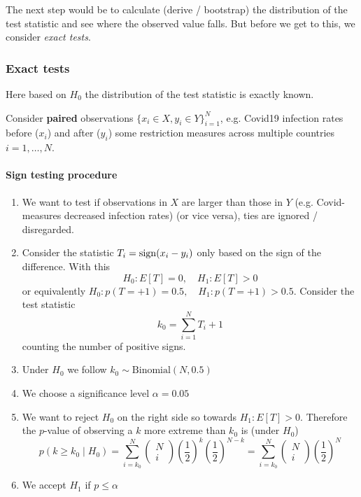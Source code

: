 The next step would be to calculate (derive / bootstrap) the distribution of the test statistic and see
where the observed value falls. But before we get to this, we consider 
\textit{exact tests}.

\subsubsection{Exact tests}
Here based on $H_0$ the distribution of the test statistic is exactly known.

Consider \textbf{paired} observations $\{ x_i \in X, y_i \in Y \}_{i=1}^N$, e.g. Covid19 infection rates before
($x_i$) and after ($y_i$) some restriction measures across multiple countries $i=1,\ldots,N$.
\paragraph*{Sign testing procedure}
\begin{enumerate}
    \item We want to test if observations in $X$ are larger than those in $Y$ (e.g. Covid-measures
    decreased infection rates) (or vice versa), ties are ignored / disregarded.
    \item Consider the statistic $T_i = \operatorname{sign}(x_i-y_i)$ only based on the sign of the difference.
    With this
    \begin{equation}
        H_0: E[T] = 0, \quad H_1: E[T] > 0
    \end{equation}
    or equivalently $H_0: p(T = +1) = 0.5, \quad H_1: p(T = +1) > 0.5$. Consider the test statistic
    \begin{equation}
        k_0 = \sum_{i=1}^N T_i + 1
    \end{equation}
    counting the number of positive signs.
    \item Under $H_0$ we follow $k_0 \sim \text{Binomial}(N,0.5)$
    \item We choose a significance level $\alpha = 0.05$
    \item We want to reject $H_0$ on the right side so towards $H_1: E[T] > 0$. Therefore
    the $p$-value of observing a $k$ more extreme than $k_0$ is (under $H_0$)
    \begin{equation}
        p\left(k \geq k_0 \mid H_0\right)=\sum_{i=k_0}^N\left(\begin{array}{c}
        N \\
        i
        \end{array}\right)\left(\frac{1}{2}\right)^k\left(\frac{1}{2}\right)^{N-k}=\sum_{i=k_0}^N\left(\begin{array}{c}
        N \\
        i
        \end{array}\right)\left(\frac{1}{2}\right)^N
        \end{equation}
    \item We accept $H_1$ if $p \leq \alpha$
\end{enumerate}

